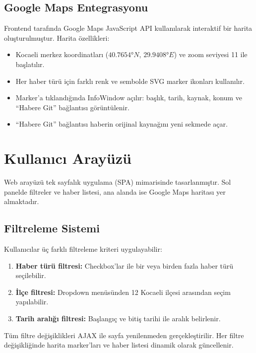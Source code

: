 \documentclass[conference]{IEEEtran}
\begin{document}
\subsection{Google Maps Entegrasyonu}

Frontend tarafında Google Maps JavaScript API kullanılarak interaktif bir harita oluşturulmuştur. Harita özellikleri:

\begin{itemize}
    \item Kocaeli merkez koordinatları ($40.7654°N$, $29.9408°E$) ve zoom seviyesi 11 ile başlatılır.
    \item Her haber türü için farklı renk ve sembolde SVG marker ikonları kullanılır.
    \item Marker'a tıklandığında InfoWindow açılır: başlık, tarih, kaynak, konum ve ``Habere Git'' bağlantısı görüntülenir.
    \item ``Habere Git'' bağlantısı haberin orijinal kaynağını yeni sekmede açar.
\end{itemize}

\section{Kullanıcı Arayüzü}

Web arayüzü tek sayfalık uygulama (SPA) mimarisinde tasarlanmıştır. Sol panelde filtreler ve haber listesi, ana alanda ise Google Maps haritası yer almaktadır.

\subsection{Filtreleme Sistemi}

Kullanıcılar üç farklı filtreleme kriteri uygulayabilir:

\begin{enumerate}
    \item \textbf{Haber türü filtresi:} Checkbox'lar ile bir veya birden fazla haber türü seçilebilir.
    \item \textbf{İlçe filtresi:} Dropdown menüsünden 12 Kocaeli ilçesi arasından seçim yapılabilir.
    \item \textbf{Tarih aralığı filtresi:} Başlangıç ve bitiş tarihi ile aralık belirlenir.
\end{enumerate}

Tüm filtre değişiklikleri AJAX ile sayfa yenilenmeden gerçekleştirilir. Her filtre değişikliğinde harita marker'ları ve haber listesi dinamik olarak güncellenir.
\end{document}
